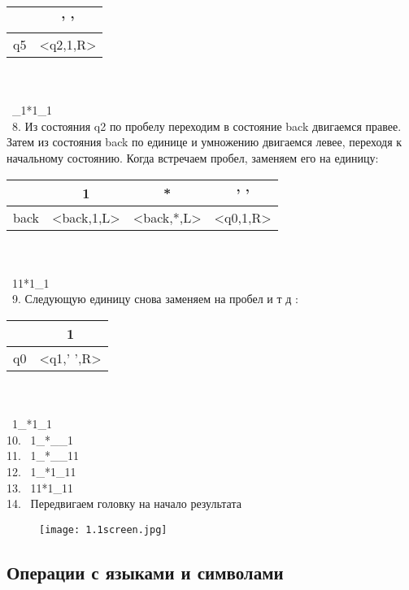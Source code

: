 \documentclass[a4paper]{article}
\begin{document}
\begin{enumerate}
\begin{tabular}{|*{2}{c|}}
\textbf{ }  & ' ' \\
\hline\hline
q5 & <q2,1,R> \\
\end{tabular}
\\ \\
\ \_1*1\_1\\
\ 8. Из состояния q2 по пробелу переходим в состояние back двигаемся правее. Затем из состояния back по единице и умножению двигаемся левее, переходя к начальному состоянию. Когда встречаем пробел, заменяем его на единицу: \\
\begin{tabular}{|*{4}{c|}}
\textbf{ }  & 1 & * & ' ' \\
\hline\hline
back & <back,1,L>& <back,*,L> &<q0,1,R> \\
\end{tabular}
\\ \\
\ 11*1\_1\\

\ 9. Следующую единицу снова заменяем на пробел и т д : \\
\begin{tabular}{|*{2}{c|}}
\textbf{ }  & 1 \\
\hline\hline
q0 & <q1,' ',R> \\
\end{tabular}
\\ \\
\ 1\_*1\_1\\
10. \ 1\_*\_\_1\\
11. \ 1\_*\_\_11\\
12. \ 1\_*1\_11\\
13. \ 11*1\_11\\
14. \ Передвигаем головку на начало результата\\
\begin{figure}[h]
        \centering
        \texttt{[image: 1.1screen.jpg]}
    \end{figure}
\end{enumerate}

\subsection{Операции с языками и символами}
\end{document}

